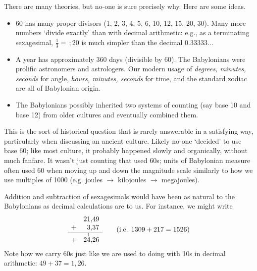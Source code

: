
There are many theories, but no-one is sure precisely why. Here are some ideas.
\begin{itemize}
  \item 60 has many proper divisors (1, 2, 3, 4, 5, 6, 10, 12, 15, 20, 30). Many more numbers `divide exactly' than with decimal arithmetic: e.g., as a terminating sexagesimal, $\frac 13=\,;20$ is much simpler than the decimal $0.33333\ldots$
  \item A year has approximately 360 days (divisible by 60). The Babylonians were prolific astronomers and astrologers. Our modern usage of \emph{degrees, minutes, seconds} for angle, \emph{hours, minutes, seconds} for time, and the standard zodiac are all of Babylonian origin.
  \item The Babylonians possibly inherited two systems of counting (say base 10 and base 12) from older cultures and eventually combined them.
\end{itemize}
This is the sort of historical question that is rarely answerable in a satisfying way, particularly when discussing an ancient culture. Likely no-one `decided' to use base 60; like most culture, it probably happened slowly and organically, without much fanfare.
\smallbreak
It wasn't just counting that used 60s; units of Babylonian measure often used 60 when moving up and down the magnitude scale similarly to how we use multiples of 1000 (e.g.{} joules $\rightarrow$ kilojoules $\rightarrow$ megajoules). 


\label{babmult}

Addition and subtraction of sexagesimals would have been as natural to the Babylonians as decimal calculations are to us. For instance, we might write
\[
	\begin{array}{rr@{,}r}
		&21&49\\
		+&3&37\\\hline
		+&2\overset{1}{4}&26\\
	\end{array} 
	\tag{i.e.{} $1309+217=1526$}
\]
Note how we carry 60s just like we are used to doing with 10s in decimal arithmetic: $49+37=1,26$.
\smallbreak

